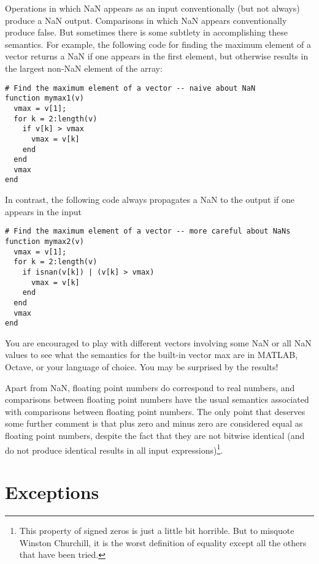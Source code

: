 \documentclass[12pt, leqno]{article} %
\begin{document}
Operations in which NaN appears as an input conventionally (but not always)
produce a NaN output.  Comparisons in which NaN appears conventionally produce false.
But sometimes there is some subtlety in accomplishing these
semantics.  For example, the following code for finding the maximum
element of a vector returns a NaN if one appears
in the first element, but otherwise results in the largest non-NaN
element of the array:
\begin{lstlisting}
# Find the maximum element of a vector -- naive about NaN
function mymax1(v)
  vmax = v[1];
  for k = 2:length(v)
    if v[k] > vmax
      vmax = v[k]
    end
  end
  vmax
end
\end{lstlisting}
In contrast, the following code always propagates a NaN to the output
if one appears in the input
\begin{lstlisting}
# Find the maximum element of a vector -- more careful about NaNs
function mymax2(v)
  vmax = v[1];
  for k = 2:length(v)
    if isnan(v[k]) | (v[k] > vmax)
      vmax = v[k]
    end
  end
  vmax
end
\end{lstlisting}
You are encouraged to play with different vectors involving some NaN
or all NaN values to see what the semantics for the built-in
vector max are in MATLAB, Octave, or your language of choice.
You may be surprised by the results!

Apart from NaN, floating point numbers do correspond to real numbers,
and comparisons between floating point numbers have the usual semantics
associated with comparisons between floating point numbers.  The only
point that deserves some further comment is that plus zero and minus
zero are considered equal as floating point numbers, despite the fact
that they are not bitwise identical (and do not produce identical
results in all input expressions)\footnote{%
This property of signed zeros is just a little bit horrible.
But to misquote Winston Churchill, it is the worst
definition of equality except all the others that have been tried.
}.

\section{Exceptions}
\end{document}
